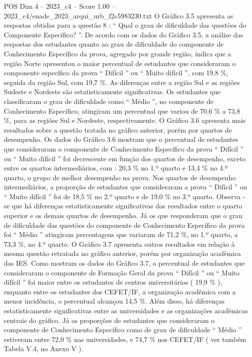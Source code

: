 \begin{textsample}{POS Dim 4 – 2023\_c4 – Score 1.00 – 2023\_c4/enade\_2023\_arqui\_urb\_f2c5983230.txt}
O Gráfico 3.5 apresenta as respostas obtidas para a questão 8 : “ Qual o grau de dificuldade das questões do Componente Específico? ”.
De acordo com os dados do Gráfico 3.5, a análise das respostas dos estudantes quanto ao grau de dificuldade do componente de Conhecimento Específico da prova, agregado por grande região, indica que a região Norte apresentou o maior percentual de estudantes que consideraram o componente específico da prova “ Difícil ” ou “ Muito difícil ”, com 19,8 \%, seguida da região Sul, com 19,7 \%.
As diferenças entre a região Sul e as regiões Sudeste e Nordeste são estatisticamente significativas.
Os estudantes que classificaram o grau de dificuldade como “ Médio ”, no componente de Conhecimento Específico, atingiram um percentual que variou de 70,6 \% a 73,8 \%, para as regiões Sul e Nordeste, respectivamente.
O Gráfico 3.6 apresenta mais resultados sobre a questão tratada no gráfico anterior, porém por quartos de desempenho.
Os dados do Gráfico 3.6 mostram que o percentual de estudantes que consideraram o componente de Conhecimento Específico da prova “ Difícil ” ou “ Muito difícil ” foi decrescente em função dos quartos de desempenho, exceto entre os quartos intermediários, com : 20,3 \% no 1.º quarto e 13,4 \% no 4.º quarto, o grupo de melhor desempenho na prova.
Nos quartos de desempenho intermediários, a proporção de estudantes que consideraram a prova “ Difícil ” ou “ Muito difícil ” foi de 18,5 \% no 2.º quarto e de 19,0 \% no 3.º quarto.
Observa -se que há diferenças estatisticamente significativas dos resultados entre o quarto superior e os demais quartos de desempenho.
Já os que responderam que o grau de dificuldade das questões do componente de Conhecimento Específico da prova foi “ Médio ” atingiram percentagens que variaram de 71,2 \%, no 1.º quarto, a 73,3 \%, no 4.º quarto.
O Gráfico 3.7 apresenta outros resultados em relação à mesma questão retratada no gráfico anterior, porém por organização acadêmica das IES.
Como mostram os dados do Gráfico 3.7, o percentual de estudantes que consideraram o componente de Formação Geral da prova “ Difícil ” ou “ Muito difícil ” foi maior entre os estudantes de centros universitários ( 19,9 \% ), enquanto entre os estudantes dos CEFET/IF, a organização acadêmica com a menor incidência, o percentual alcançou 14,5 \%.
Além disso, há diferenças estatisticamente significativas entre as universidades e as organizações acadêmicas centrais do gráfico.
Já as proporções de estudantes que consideraram o componente de Conhecimento Específico como de grau de dificuldade “ Médio ” estiveram entre 72,0 \% nas universidades, e 74,7 \% nos CEFET/IF ( ver também Tabela V.4, no Anexo V ).

\end{textsample}
